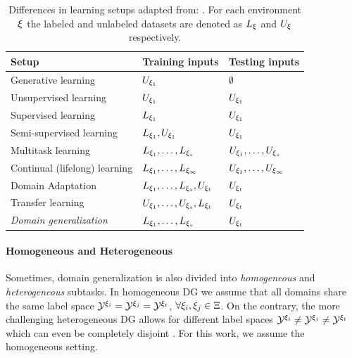 \begin{table}[t]
    \centering
    \begin{tabular}{lll}
    \toprule
    \textbf{Setup} & \textbf{Training inputs}  & \textbf{Testing inputs} \\
    \midrule
        Generative learning & $U_{\xi_1}$ & $\emptyset$ \\ 
        Unsupervised learning & $U_{\xi_1}$ & $U_{\xi_1}$  \\ 
        Supervised learning & $L_{\xi_1}$ & $U_{\xi_1}$ \\ 
        Semi-supervised learning & $L_{\xi_1}, U_{\xi_1}$ & $U_{\xi_1}$ \\ 
        Multitask learning & $L_{\xi_1}, \ldots, L_{\xi_s}$ & $U_{\xi_1}, \ldots, U_{\xi_s}$ \\ 
        Continual (lifelong) learning & $L_{\xi_1}, \ldots, L_{\xi_\infty}$ & $U_{\xi_1}, \ldots, U_{\xi_\infty}$ \\ 
        Domain Adaptation & $L_{\xi_1}, \ldots, L_{\xi_s}, U_{\xi_t}$ & $U_{\xi_t}$ \\ 
        Transfer learning & $U_{\xi_1}, \ldots, U_{\xi_s}, L_{\xi_t}$ & $U_{\xi_t}$ \\ 
        \emph{Domain generalization} & $L_{\xi_1}, \ldots, L_{\xi_s}$ & $U_{\xi_t}$ \\ 
    \bottomrule
    \end{tabular}
    \caption[Differences in learning setups]{Differences in learning setups adapted from: \citep{gulrajani2020search}. For each environment $\xi$ the labeled and unlabeled datasets are denoted as $L_\xi$ and $U_\xi$ respectively.}
    \label{tab:learning_setups}
\end{table}

\paragraph{Homogeneous and Heterogeneous}
Sometimes, domain generalization is also divided into \emph{homogeneous} and \emph{heterogeneous} subtasks. In homogeneous DG we assume that all domains share the same label space $\mathcal{Y}^{\xi_i} = \mathcal{Y}^{\xi_j} = \mathcal{Y}^{\xi_t}$, $\forall \xi_i, \xi_j \in \Xi$. On the contrary, the more challenging heterogeneous DG allows for different label spaces $\mathcal{Y}^{\xi_i} \neq \mathcal{Y}^{\xi_j} \neq \mathcal{Y}^{\xi_t}$ which can even be completely disjoint \citep{LiZYLSH19}. For this work, we assume the homogeneous setting.

